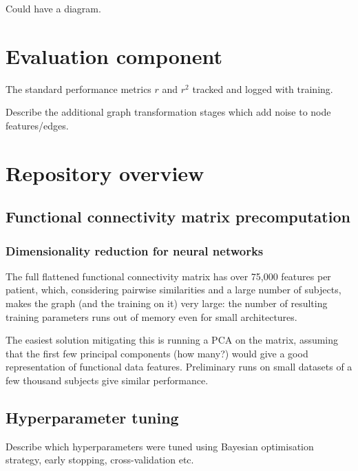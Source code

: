 Could have a diagram.


\section{Evaluation component}
The standard performance metrics $r$ and $r^2$ tracked and logged with training.

Describe the additional graph transformation stages which add noise to node features/edges.


\section{Repository overview}


\newpage




\subsection{Functional connectivity matrix precomputation}

\subsubsection{Dimensionality reduction for neural networks}
The full flattened functional connectivity matrix has over 75,000 features per patient, which, considering pairwise similarities and a large number of subjects, makes the graph (and the training on it) very large: the number of resulting training parameters runs out of memory even for small architectures.

The easiest solution mitigating this is running a PCA on the matrix, assuming that the first few principal components (how many?) would give a good representation of functional data features. Preliminary runs on small datasets of a few thousand subjects give similar performance.



\subsection{Hyperparameter tuning}
Describe which hyperparameters were tuned using Bayesian optimisation strategy, early stopping, cross-validation etc.




